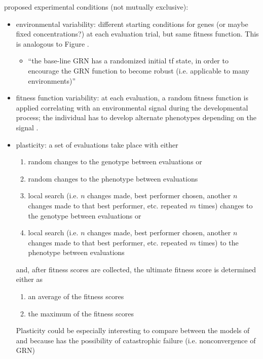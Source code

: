 proposed experimental conditions (not mutually exclusive):
\begin{itemize}
  \item environmental variability: different starting conditions for genes (or maybe fixed concentrations?) at each evaluation trial, but same fitness function. This is analogous to Figure .
  \begin{itemize}
  	\item ``the base-line GRN has a randomized initial tf state, in order to encourage the GRN function to become robust (i.e. applicable to many environments)'' \cite{Reisinger2005TowardsEvolvability}
  \end{itemize}
  \item fitness function variability: at each evaluation, a random fitness function is applied correlating with an environmental signal during the developmental process; the individual has to develop alternate phenotypes depending on the signal .
  \item plasticity: a set of evaluations take place with either 
  \begin{enumerate}[label=\alph*)]
    \item random changes to the genotype between evaluations or
    \item random changes to the phenotype between evaluations 
    \item local search (i.e. $n$ changes made, best performer chosen, another $n$ changes made to that best performer, etc. repeated $m$ times)  changes to the genotype between evaluations or
    \item local search (i.e. $n$ changes made, best performer chosen, another $n$ changes made to that best performer, etc. repeated $m$ times) to the phenotype between evaluations 
  \end{enumerate}
  and, after fitness scores are collected, the ultimate fitness score is determined either as
  \begin{enumerate}[label=\alph*)]
    \item an average of the fitness scores
    \item the maximum of the fitness scores
  \end{enumerate}
  Plasticity could be especially interesting to compare between the models of \cite{Reisinger2005TowardsEvolvability} and \cite{Wilder2015ReconcilingEvolvability} because \cite{Wilder2015ReconcilingEvolvability} has the possibility of catastrophic failure (i.e. nonconvergence of GRN)
\end{itemize}

